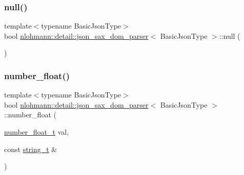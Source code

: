 \mbox{\label{classnlohmann_1_1detail_1_1json__sax__dom__parser_abb06babaa861f123d8d0cb443b887d8a}} 
\subsubsection{\texorpdfstring{null()}{null()}}
{\footnotesize\ttfamily template$<$typename Basic\+Json\+Type$>$ \\
bool \hyperlink{classnlohmann_1_1detail_1_1json__sax__dom__parser}{nlohmann\+::detail\+::json\+\_\+sax\+\_\+dom\+\_\+parser}$<$ Basic\+Json\+Type $>$\+::null (\begin{DoxyParamCaption}{ }\end{DoxyParamCaption})\hspace{0.3cm}{\ttfamily [inline]}}

\mbox{\label{classnlohmann_1_1detail_1_1json__sax__dom__parser_aef4652c0e81d6c052acb5d36afe09499}} 
\subsubsection{\texorpdfstring{number\+\_\+float()}{number\_float()}}
{\footnotesize\ttfamily template$<$typename Basic\+Json\+Type$>$ \\
bool \hyperlink{classnlohmann_1_1detail_1_1json__sax__dom__parser}{nlohmann\+::detail\+::json\+\_\+sax\+\_\+dom\+\_\+parser}$<$ Basic\+Json\+Type $>$\+::number\+\_\+float (\begin{DoxyParamCaption}\item[{\hyperlink{classnlohmann_1_1detail_1_1json__sax__dom__parser_ad8da3aad0147b18b3cb76868480300fe}{number\+\_\+float\+\_\+t}}]{val,  }\item[{const \hyperlink{classnlohmann_1_1detail_1_1json__sax__dom__parser_afd4d961ab2a6b01cbe6e840f7fb90cdc}{string\+\_\+t} \&}]{ }\end{DoxyParamCaption})\hspace{0.3cm}{\ttfamily [inline]}}

